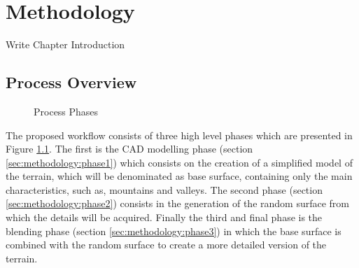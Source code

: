 \chapter{Methodology} \label{chap:methodology}

\begin{notes}
	\item Write Chapter Introduction
\end{notes}

\section{Process Overview}

\begin{figure}[h!]
	\begin{center}
	\end{center}
	
	\caption{Process Phases}
	\label{fig:process_phases}
\end{figure}

The proposed workflow consists of three high level phases which are presented in Figure \ref{fig:process_phases}. The first is the CAD modelling phase (section \ref{sec:methodology:phase1}) which consists on the creation of a simplified model of the terrain, which will be denominated as base surface, containing only the main characteristics, such as, mountains and valleys. The second phase (section \ref{sec:methodology:phase2}) consists in the generation of the random surface from which the details will be acquired. Finally the third and final phase is the blending phase (section \ref{sec:methodology:phase3}) in which the base surface is combined with the random surface to create a more detailed version of the terrain.

